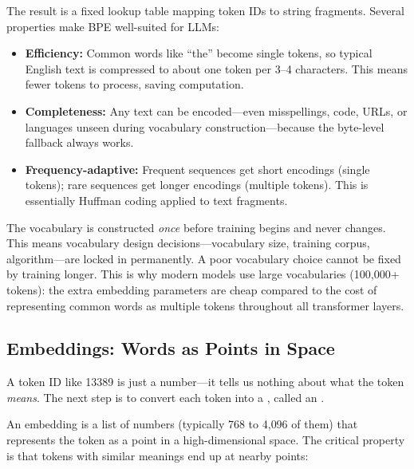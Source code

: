 The result is a fixed lookup table mapping token IDs to string
fragments. Several properties make BPE well-suited for LLMs:

\begin{itemize}[leftmargin=2em]
  \item \textbf{Efficiency:} Common words like ``the'' become single
    tokens, so typical English text is compressed to about one token
    per 3--4 characters. This means fewer tokens to process, saving
    computation.
  \item \textbf{Completeness:} Any text can be encoded---even
    misspellings, code, URLs, or languages unseen during vocabulary
    construction---because the byte-level fallback always works.
  \item \textbf{Frequency-adaptive:} Frequent sequences get short
    encodings (single tokens); rare sequences get longer encodings
    (multiple tokens). This is essentially Huffman coding applied to
    text fragments.
\end{itemize}

\begin{engineernote}
The vocabulary is constructed \emph{once} before training begins and
never changes. This means vocabulary design decisions---vocabulary
size, training corpus, algorithm---are locked in permanently. A poor
vocabulary choice cannot be fixed by training longer. This is why
modern models use large vocabularies (100{,}000+ tokens): the extra
embedding parameters are cheap compared to the cost of representing
common words as multiple tokens throughout all transformer layers.
\end{engineernote}

\subsection{Embeddings: Words as Points in Space}
\label{sec:embeddings}

A token ID like 13389 is just a number---it tells us nothing about
what the token \emph{means}. The next step is to convert each token
into a , called an
.

An embedding is a list of numbers (typically 768 to 4{,}096 of them)
that represents the token as a point in a high-dimensional space. The
critical property is that tokens with similar meanings end up at
nearby points:

